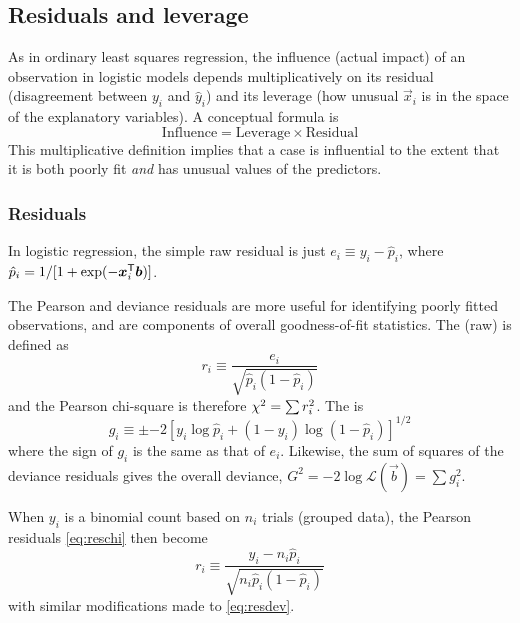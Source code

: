 \documentclass[11pt]{book}\usepackage[]{graphicx}\usepackage[]{color}
\begin{document}
\subsection{Residuals and leverage}\label{sec:logist-resids}
As in ordinary least squares regression, the influence (actual impact)
of an observation in logistic models depends multiplicatively
on its residual (disagreement between $y_i$ and $\hat{y}_i$)
and its leverage (how unusual $\vec{x}_i$ is in the space of the
explanatory variables).
A conceptual formula is
\begin{equation*}
  \mathrm{Influence} = \mathrm{Leverage} \times \mathrm{Residual}
\end{equation*}
This multiplicative definition implies that a case is influential to
the extent that it is both poorly fit \emph{and} has unusual values of
the predictors.

\subsubsection{Residuals}
In logistic regression, the simple raw residual is just $e_i \equiv y_i - \hat{p}_i$,
where 
$ \hat{p}_i = 1 / [1 + \exp(- \bm{x}_i^\mathsf{T} \bm{b} )]$.

The  Pearson and deviance residuals are more useful for identifying
poorly fitted observations, and are components of overall goodness-of-fit
statistics.
The (raw)  is defined as
\begin{equation}\label{eq:reschi}
r_i \equiv \frac{e_i}{\sqrt{ \widehat{p}_i  (1-\widehat{p}_i)}}
\end{equation}
and the Pearson chi-square is therefore $\chi^2 = \sum r_i^2$.
The  is
\begin{equation}\label{eq:resdev}
g_i \equiv \pm { -2 [ y_i \log \widehat{p}_i  + (1-y_i) \log (1-\widehat{p}_i) ] }^{1/2}
\end{equation}
where the sign of $g_i$ is the same as that of $e_i$.
Likewise, the sum of squares of the deviance residuals gives
the overall deviance,
$G^2 = -2 \log \mathcal{L}(\vec{b}) = \sum g_i^2$.

When $y_i$ is a binomial count based on $n_i$ trials (grouped data),
the Pearson residuals \eqref{eq:reschi} then become
\begin{equation*}%
r_i \equiv \frac{y_i -n_i \widehat{p}_i}{\sqrt{n_i  \widehat{p}_i  (1-\widehat{p}_i)}}
\end{equation*}
with similar modifications made to \eqref{eq:resdev}.
\end{document}
